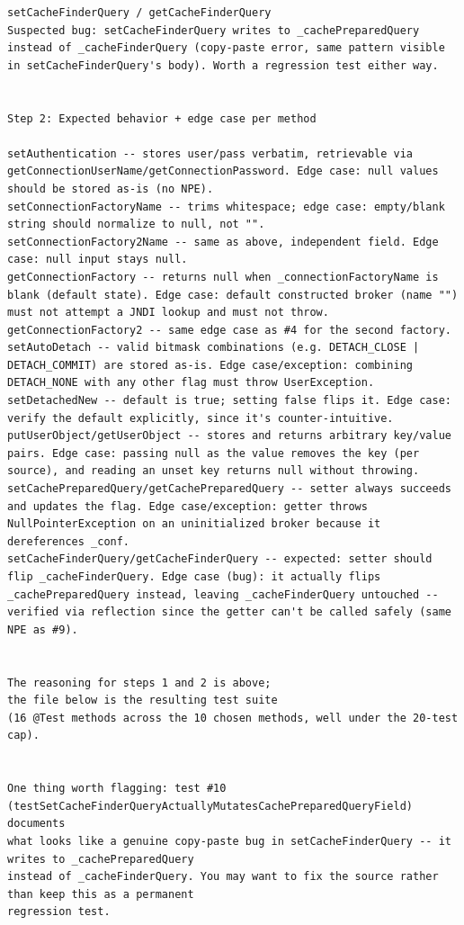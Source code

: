 \begin{lstlisting}
setCacheFinderQuery / getCacheFinderQuery
Suspected bug: setCacheFinderQuery writes to _cachePreparedQuery instead of _cacheFinderQuery (copy-paste error, same pattern visible in setCacheFinderQuery's body). Worth a regression test either way.


Step 2: Expected behavior + edge case per method

setAuthentication -- stores user/pass verbatim, retrievable via getConnectionUserName/getConnectionPassword. Edge case: null values should be stored as-is (no NPE).
setConnectionFactoryName -- trims whitespace; edge case: empty/blank string should normalize to null, not "".
setConnectionFactory2Name -- same as above, independent field. Edge case: null input stays null.
getConnectionFactory -- returns null when _connectionFactoryName is blank (default state). Edge case: default constructed broker (name "") must not attempt a JNDI lookup and must not throw.
getConnectionFactory2 -- same edge case as #4 for the second factory.
setAutoDetach -- valid bitmask combinations (e.g. DETACH_CLOSE | DETACH_COMMIT) are stored as-is. Edge case/exception: combining DETACH_NONE with any other flag must throw UserException.
setDetachedNew -- default is true; setting false flips it. Edge case: verify the default explicitly, since it's counter-intuitive.
putUserObject/getUserObject -- stores and returns arbitrary key/value pairs. Edge case: passing null as the value removes the key (per source), and reading an unset key returns null without throwing.
setCachePreparedQuery/getCachePreparedQuery -- setter always succeeds and updates the flag. Edge case/exception: getter throws NullPointerException on an uninitialized broker because it dereferences _conf.
setCacheFinderQuery/getCacheFinderQuery -- expected: setter should flip _cacheFinderQuery. Edge case (bug): it actually flips _cachePreparedQuery instead, leaving _cacheFinderQuery untouched -- verified via reflection since the getter can't be called safely (same NPE as #9).


The reasoning for steps 1 and 2 is above;
the file below is the resulting test suite
(16 @Test methods across the 10 chosen methods, well under the 20-test cap).


One thing worth flagging: test #10 (testSetCacheFinderQueryActuallyMutatesCachePreparedQueryField) documents
what looks like a genuine copy-paste bug in setCacheFinderQuery -- it writes to _cachePreparedQuery
instead of _cacheFinderQuery. You may want to fix the source rather than keep this as a permanent
regression test.



\end{lstlisting}

